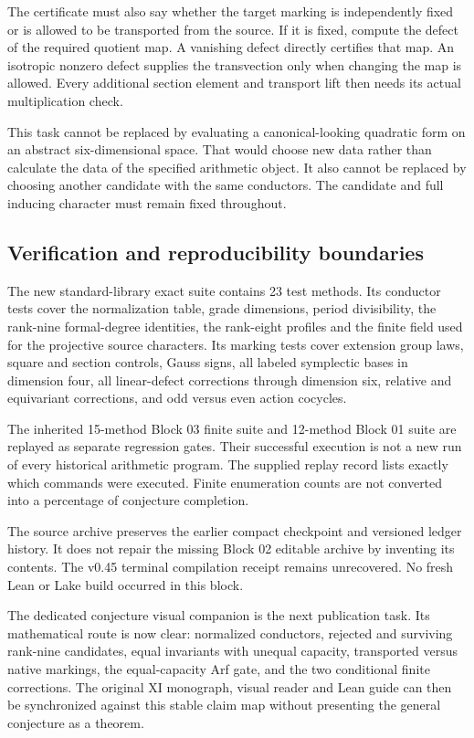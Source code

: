 The certificate must also say whether the target marking is independently fixed or is allowed to be transported from the source. If it is fixed, compute the defect of the required quotient map. A vanishing defect directly certifies that map. An isotropic nonzero defect supplies the transvection only when changing the map is allowed. Every additional section element and transport lift then needs its actual multiplication check.

This task cannot be replaced by evaluating a canonical-looking quadratic form on an abstract six-dimensional space. That would choose new data rather than calculate the data of the specified arithmetic object. It also cannot be replaced by choosing another candidate with the same conductors. The candidate and full inducing character must remain fixed throughout.

\subsection{Verification and reproducibility boundaries}
The new standard-library exact suite contains 23 test methods. Its conductor tests cover the normalization table, grade dimensions, period divisibility, the rank-nine formal-degree identities, the rank-eight profiles and the finite field used for the projective source characters. Its marking tests cover extension group laws, square and section controls, Gauss signs, all labeled symplectic bases in dimension four, all linear-defect corrections through dimension six, relative and equivariant corrections, and odd versus even action cocycles.

The inherited 15-method Block 03 finite suite and 12-method Block 01 suite are replayed as separate regression gates. Their successful execution is not a new run of every historical arithmetic program. The supplied replay record lists exactly which commands were executed. Finite enumeration counts are not converted into a percentage of conjecture completion.

The source archive preserves the earlier compact checkpoint and versioned ledger history. It does not repair the missing Block 02 editable archive by inventing its contents. The v0.45 terminal compilation receipt remains unrecovered. No fresh Lean or Lake build occurred in this block.

The dedicated conjecture visual companion is the next publication task. Its mathematical route is now clear: normalized conductors, rejected and surviving rank-nine candidates, equal invariants with unequal capacity, transported versus native markings, the equal-capacity Arf gate, and the two conditional finite corrections. The original XI monograph, visual reader and Lean guide can then be synchronized against this stable claim map without presenting the general conjecture as a theorem.

